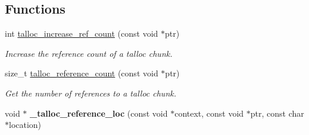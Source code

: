 \subsection*{Functions}
\begin{DoxyCompactItemize}
\item 
int \hyperlink{group__talloc__ref_ga1d70927673b42a6d2e42823307280502}{talloc\+\_\+increase\+\_\+ref\+\_\+count} (const void $\ast$ptr)
\begin{DoxyCompactList}\small\item\em Increase the reference count of a talloc chunk. \end{DoxyCompactList}\item 
size\+\_\+t \hyperlink{group__talloc__ref_gac8bc504b29c4a0b3252e69f14a241035}{talloc\+\_\+reference\+\_\+count} (const void $\ast$ptr)
\begin{DoxyCompactList}\small\item\em Get the number of references to a talloc chunk. \end{DoxyCompactList}\item 
\hypertarget{group__talloc__ref_gafe478eebc954a90bf11ffee3ea73b885}{}void $\ast$ {\bfseries \+\_\+talloc\+\_\+reference\+\_\+loc} (const void $\ast$context, const void $\ast$ptr, const char $\ast$location)\label{group__talloc__ref_gafe478eebc954a90bf11ffee3ea73b885}


\end{DoxyCompactItemize}

